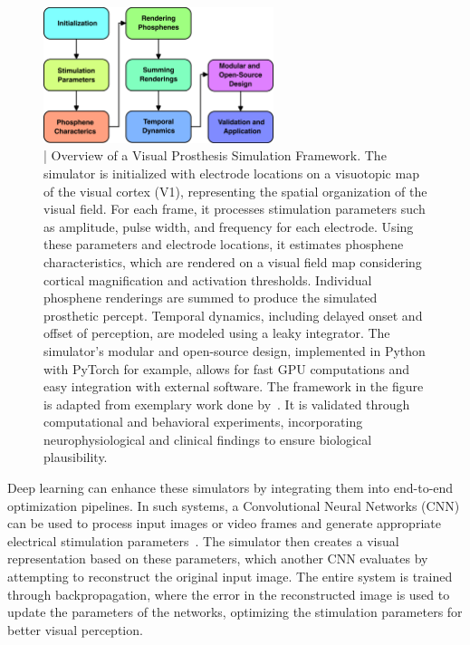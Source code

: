 \documentclass[10pt]{article}
\begin{document}
\begin{figure}[ht!]
  \centering
  \includegraphics[width=0.6\textwidth]{imgs/block_diagram_vis_prost.png}
  \caption{| Overview of a Visual Prosthesis Simulation Framework. The
    simulator is initialized with electrode locations on a visuotopic map of the
    visual cortex (V1), representing the spatial organization of the visual
    field. For each frame, it processes stimulation parameters such as
    amplitude, pulse width, and frequency for each electrode. Using these
    parameters and electrode locations, it estimates phosphene characteristics,
    which are rendered on a visual field map considering cortical magnification
    and activation thresholds. Individual phosphene renderings are summed to
    produce the simulated prosthetic percept. Temporal dynamics, including
    delayed onset and offset of perception, are modeled using a leaky
    integrator. The simulator's modular and open-source design, implemented in
    Python with PyTorch for example, allows for fast GPU computations and easy
    integration with external software. The framework in the figure is adapted
    from exemplary work done
    by~\textcite{deruytervansteveninckEndtoendOptimizationProsthetic2022}. It is
    validated through computational and behavioral experiments, incorporating
    neurophysiological and clinical findings to ensure biological
    plausibility.}\label{fig:simulator_framework}
\end{figure}

Deep learning can enhance these simulators by integrating them into end-to-end
optimization pipelines. In such systems, a Convolutional Neural Networks (CNN)
can be used to process input images or video frames and generate appropriate
electrical stimulation
parameters~\parencite{wangNeuroSEENeuromorphicEnergyEfficient2022}. The
simulator then creates a visual representation based on these parameters, which
another CNN evaluates by attempting to reconstruct the original input image. The
entire system is trained through backpropagation, where the error in the
reconstructed image is used to update the parameters of the networks, optimizing
the stimulation parameters for better visual perception.
\end{document}
